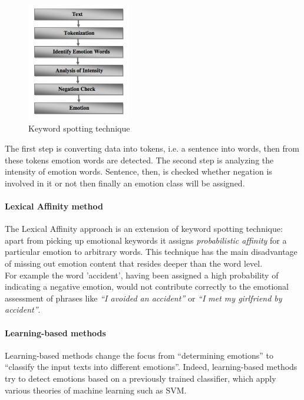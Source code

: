 \begin{figure}[H]
\centering
\includegraphics[width=0.4\textwidth]{./chapters/chapter1/images/keyword_spotting}
\caption{Keyword spotting technique}
\label{fig:keyword_spotting}
\end{figure}

The first step is converting data into tokens, i.e. a sentence into words, then from these tokens emotion words are detected. The second step is analyzing the intensity of emotion words. Sentence, then, is checked whether negation is involved in it or not then finally an emotion class will be assigned.

\paragraph{Lexical Affinity method} 
The Lexical Affinity approach is an extension of keyword spotting technique: apart from picking up emotional keywords it assigns \textit{probabilistic affinity} for a particular emotion to arbitrary words. This technique has the main disadvantage of missing out emotion content that resides deeper than the word level.\\
For example the word 'accident', having been assigned a high probability of indicating a negative emotion, would not contribute correctly to the emotional assessment of phrases like \textit{``I avoided an accident''} or \textit{``I met my girlfriend by accident''}. 

\paragraph{Learning-based methods}
Learning-based methods change the focus from ``determining emotions'' to ``classify the input texts into different emotions''. Indeed, learning-based methods try to detect emotions based on a previously trained classifier, which apply various theories of machine learning such as SVM.

